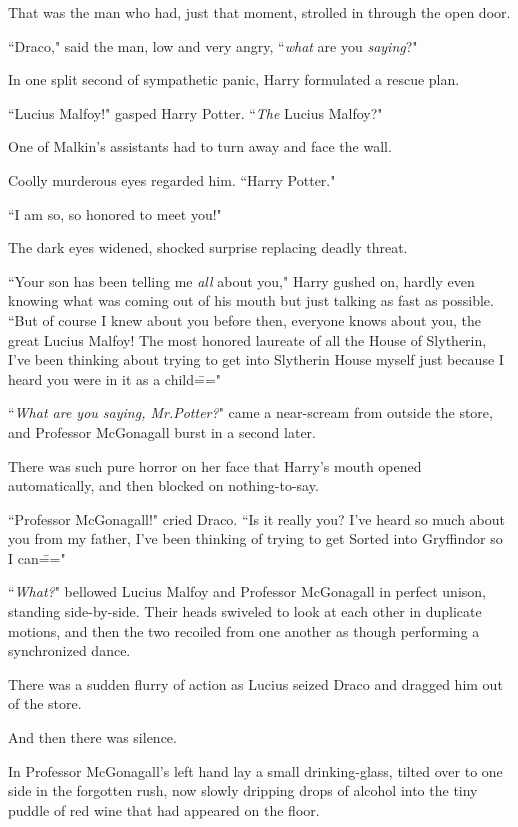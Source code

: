 That was the man who had, just that moment, strolled in through the open door.

``Draco," said the man, low and very angry, ``\emph{what} are you \emph{saying}?"

In one split second of sympathetic panic, Harry formulated a rescue plan.

``Lucius Malfoy!" gasped Harry Potter. ``\emph{The} Lucius Malfoy?"

One of Malkin's assistants had to turn away and face the wall.

Coolly murderous eyes regarded him. ``Harry Potter."

``I am so, so honored to meet you!"

The dark eyes widened, shocked surprise replacing deadly threat.

``Your son has been telling me \emph{all} about you," Harry gushed on, hardly even knowing what was coming out of his mouth but just talking as fast as possible. ``But of course I knew about you before then, everyone knows about you, the great Lucius Malfoy! The most honored laureate of all the House of Slytherin, I've been thinking about trying to get into Slytherin House myself just because I heard you were in it as a child\==="

``\emph{What are you saying, Mr.\?Potter?}" came a near-scream from outside the store, and Professor McGonagall burst in a second later.

There was such pure horror on her face that Harry's mouth opened automatically, and then blocked on nothing-to-say.

``Professor McGonagall!" cried Draco. ``Is it really you? I've heard so much about you from my father, I've been thinking of trying to get Sorted into Gryffindor so I can\==="

``\emph{What?}" bellowed Lucius Malfoy and Professor McGonagall in perfect unison, standing side-by-side. Their heads swiveled to look at each other in duplicate motions, and then the two recoiled from one another as though performing a synchronized dance.

There was a sudden flurry of action as Lucius seized Draco and dragged him out of the store.

And then there was silence.

In Professor McGonagall's left hand lay a small drinking-glass, tilted over to one side in the forgotten rush, now slowly dripping drops of alcohol into the tiny puddle of red wine that had appeared on the floor.

